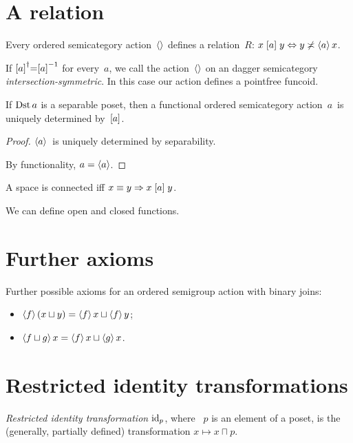 \chapter{A relation}

Every ordered semicategory action~$\left\langle \right\rangle$ defines a relation~$R$: $x\mathrel{\left[a\right]}y\Leftrightarrow y\not\asymp\left\langle a\right\rangle x$.

If $\mathrel{\left[a\right]}^{\dagger}=\mathrel{\left[a\right]}^{-1}$ for every~$a$, we call the action~$\left\langle \right\rangle$ on an dagger semicategory \emph{inter\-sec\-tion-sym\-met\-ric}. In this case our action defines a pointfree funcoid.

\begin{prop}
If $\operatorname{Dst} a$ is a separable poset, then a functional ordered semicategory action~$a$~is uniquely determined by~$\mathrel{\left[a\right]}$.
\end{prop}

\begin{proof}
$\left\langle a\right\rangle$~is uniquely determined by separability.

By functionality, $a=\left\langle a\right\rangle$.
\end{proof}

A space is connected iff $x\equiv y\Rightarrow x\mathrel{\left[a\right]}y$.

We can define open and closed functions.

\chapter{Further axioms}

Further possible axioms for an ordered semigroup action with binary joins:

\begin{itemize}
\item $\left\langle f\right\rangle(x\sqcup y)=\left\langle f\right\rangle x\sqcup\left\langle f\right\rangle y$;
\item $\left\langle f\sqcup g\right\rangle x=\left\langle f\right\rangle x\sqcup\left\langle g\right\rangle x$.
\end{itemize}


\chapter{Restricted identity transformations}

\emph{Restricted identity transformation} $\operatorname{id}_p$, where ~$p$ is an element of a poset, is the (generally, partially defined) transformation $x\mapsto x\sqcap p$.

